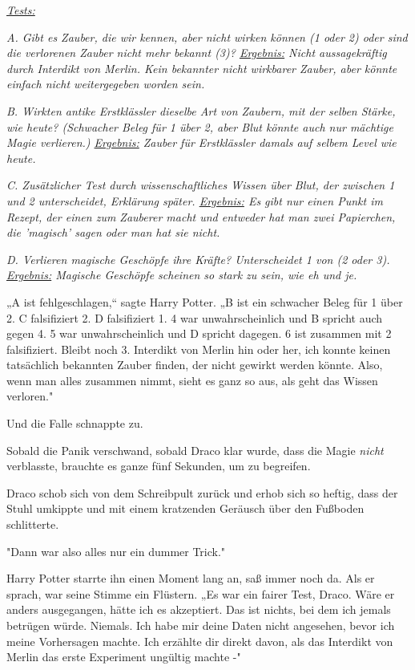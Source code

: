 {\emph{\uline{Tests:}}

\emph{A. Gibt es Zauber, die wir kennen, aber nicht wirken können (1 oder 2) oder sind die verlorenen Zauber nicht mehr bekannt (3)? \uline{Ergebnis:} Nicht aussagekräftig durch Interdikt von Merlin. Kein bekannter nicht wirkbarer Zauber, aber könnte einfach nicht weitergegeben worden sein.}

\emph{B. Wirkten antike Erstklässler dieselbe Art von Zaubern, mit der selben Stärke, wie heute? (Schwacher Beleg für 1 über 2, aber Blut könnte auch nur mächtige Magie verlieren.) \uline{Ergebnis:} Zauber für Erstklässler damals auf selbem Level wie heute.}

\emph{C. Zusätzlicher Test durch wissenschaftliches Wissen über Blut, der zwischen 1 und 2 unterscheidet, Erklärung später. \uline{Ergebnis:} Es gibt nur einen Punkt im Rezept, der einen zum Zauberer macht und entweder hat man zwei Papierchen, die 'magisch' sagen oder man hat sie nicht.}

\emph{D. Verlieren magische Geschöpfe ihre Kräfte? Unterscheidet 1 von (2 oder 3). \uline{Ergebnis:} Magische Geschöpfe scheinen so stark zu sein, wie eh und je.}

„A ist fehlgeschlagen,“ sagte Harry Potter. „B ist ein schwacher Beleg für 1 über 2. C falsifiziert 2. D falsifiziert 1. 4 war unwahrscheinlich und B spricht auch gegen 4. 5 war unwahrscheinlich und D spricht dagegen. 6 ist zusammen mit 2 falsifiziert. Bleibt noch 3. Interdikt von Merlin hin oder her, ich konnte keinen tatsächlich bekannten Zauber finden, der nicht gewirkt werden könnte. Also, wenn man alles zusammen nimmt, sieht es ganz so aus, als geht das Wissen verloren."

Und die Falle schnappte zu.

Sobald die Panik verschwand, sobald Draco klar wurde, dass die Magie \emph{nicht} verblasste, brauchte es ganze fünf Sekunden, um zu begreifen.

Draco schob sich von dem Schreibpult zurück und erhob sich so heftig, dass der Stuhl umkippte und mit einem kratzenden Geräusch über den Fußboden schlitterte.

"Dann war also alles nur ein dummer Trick."

Harry Potter starrte ihn einen Moment lang an, saß immer noch da. Als er sprach, war seine Stimme ein Flüstern. „Es war ein fairer Test, Draco. Wäre er anders ausgegangen, hätte ich es akzeptiert. Das ist nichts, bei dem ich jemals betrügen würde. Niemals. Ich habe mir deine Daten nicht angesehen, bevor ich meine Vorhersagen machte. Ich erzählte dir direkt davon, als das Interdikt von Merlin das erste Experiment ungültig machte -"

}
